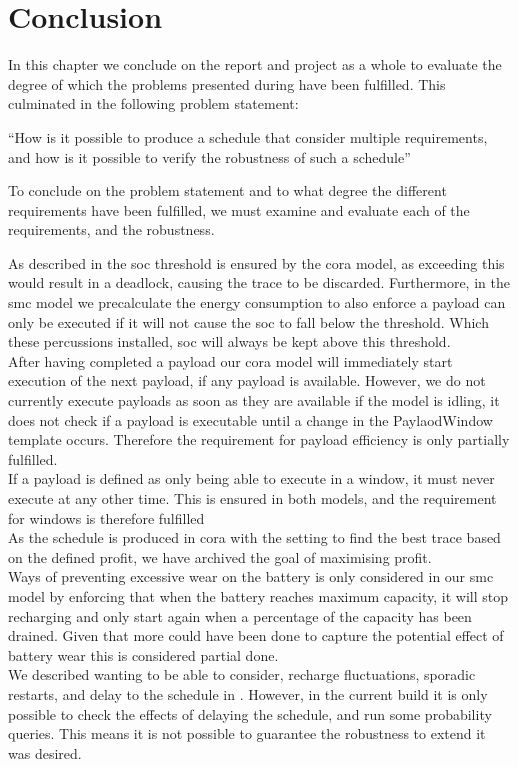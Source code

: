 \chapter{Conclusion} \label{sec:conclusion}
In this chapter we conclude on the report and project as a whole to evaluate the degree of which the problems presented during   have been fulfilled. This culminated in the following problem statement:

\enquote{How is it possible to produce a schedule that consider multiple requirements, and how is it possible to verify the robustness of such a schedule}

To conclude on the problem statement and to what degree the different requirements have been fulfilled, we must examine and evaluate each of the requirements, and the robustness.

As described in  the \gls{soc} threshold is ensured by the \gls{cora} model, as exceeding this would result in a deadlock, causing the trace to be discarded. Furthermore, in the \gls{smc} model we precalculate the energy consumption to also enforce a payload can only be executed if it will not cause the \gls{soc} to fall below the threshold.  Which these percussions installed, \gls{soc} will always be kept above this threshold.\\
After having completed a payload our \gls{cora} model will immediately start execution of the next payload, if any payload is available. However, we do not currently execute payloads as soon as they are available if the model is idling, it does not check if a payload is executable until a change in the PaylaodWindow template occurs. Therefore the requirement for payload efficiency is only partially fulfilled.\\
If a payload is defined as only being able to execute in a window, it must never execute at any other time. 
This is ensured in both models, and the requirement for windows is therefore fulfilled \\
As the schedule is produced in \gls{cora} with the setting to find the best trace based on the defined profit, we have archived the goal of maximising profit.\\
Ways of preventing excessive wear on the battery is only considered in our \gls{smc} model by enforcing that when the battery reaches maximum capacity, it will stop recharging and only start again when a percentage of the capacity has been drained.
Given that more could have been done to capture the potential effect of battery wear this is considered partial done.\\
We described wanting to be able to consider, recharge fluctuations, sporadic restarts, and delay to the schedule in .
However, in the current build it is only possible to check the effects of delaying the schedule, and run some probability queries. This means it is not possible to guarantee the robustness to extend it was desired.

